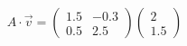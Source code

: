 \documentclass[preview]{standalone}
\begin{document}
\begin{align*}
A \cdot \vec{v} = \begin{pmatrix} 1.5 & -0.3 \\ 0.5 & 2.5 \end{pmatrix} \begin{pmatrix} 2 \\ 1.5 \end{pmatrix}
\end{align*}
\end{document}
